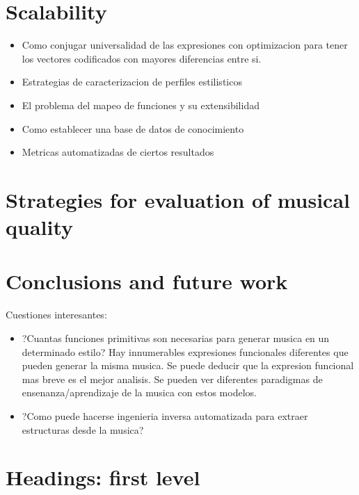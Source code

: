 \documentclass{article}
\begin{document}


\section{Scalability}
\begin{itemize}
\item Como conjugar universalidad de las expresiones con optimizacion para tener los vectores codificados con mayores diferencias entre si.
\item Estrategias de caracterizacion de perfiles estilisticos
\item El problema del mapeo de funciones y su extensibilidad
\item Como establecer una base de datos de conocimiento
\item Metricas automatizadas de ciertos resultados
\end{itemize}




\section{Strategies for evaluation of musical quality}





\section{Conclusions and future work}

Cuestiones interesantes: 
\begin{itemize}
\item ?Cuantas funciones primitivas son necesarias para generar musica en un determinado estilo? Hay innumerables expresiones funcionales diferentes que pueden generar la misma musica. Se puede deducir que la expresion funcional mas breve es el mejor analisis. Se pueden ver diferentes paradigmas de ensenanza/aprendizaje de la musica con estos modelos.
\item ?Como puede hacerse ingenieria inversa automatizada para extraer estructuras desde la musica?
\end{itemize}

\section{Headings: first level}
\label{sec:headings}
\end{document}
